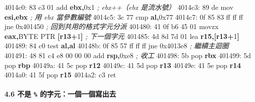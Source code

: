 \documentclass[10pt,a4paper]{article}
\newenvironment{Shaded}{\begin{snugshade}}{\end{snugshade}}
\newcommand{\BaseNTok}[1]{\textcolor[rgb]{0.00,0.00,0.81}{#1}}
\newcommand{\BuiltInTok}[1]{#1}
\newcommand{\CommentTok}[1]{\textcolor[rgb]{0.56,0.35,0.01}{\textit{#1}}}
\newcommand{\DataTypeTok}[1]{\textcolor[rgb]{0.13,0.29,0.53}{#1}}
\newcommand{\DecValTok}[1]{\textcolor[rgb]{0.00,0.00,0.81}{#1}}
\newcommand{\KeywordTok}[1]{\textcolor[rgb]{0.13,0.29,0.53}{\textbf{#1}}}
\newcommand{\NormalTok}[1]{#1}
\newcommand{\OperatorTok}[1]{\textcolor[rgb]{0.81,0.36,0.00}{\textbf{#1}}}
\renewenvironment{Shaded}{%
  \def\FrameCommand{\fboxsep=3.2pt\colorbox{shadecolor}}%
  \MakeFramed{\advance\hsize-\width\FrameRestore\small}%
}{%
  \endMakeFramed
}
\begin{document}
\begin{Shaded}
\begin{Highlighting}[]
\NormalTok{  4014c0: 83 c3 }\DecValTok{01}\NormalTok{           add  }\KeywordTok{ebx}\OperatorTok{,}\BaseNTok{0x1}          \CommentTok{; ebx++（ebx 是流水號）}
\NormalTok{  4014c3: 89 de              mov  }\KeywordTok{esi}\OperatorTok{,}\KeywordTok{ebx}          \CommentTok{; 用 ebx 當參數編號}
\NormalTok{  4014c5: 3c 77              }\BuiltInTok{cmp}  \KeywordTok{al}\OperatorTok{,}\BaseNTok{0x77}
\NormalTok{  4014c7: 0f 85 83 ff ff ff  jne  }\BaseNTok{0x401450}        \CommentTok{; 回到共用的格式字元分派}
\NormalTok{  401480: 41 0f b6 }\DecValTok{45} \DecValTok{01}\NormalTok{     movzx }\KeywordTok{eax}\OperatorTok{,}\DataTypeTok{BYTE} \DataTypeTok{PTR} \OperatorTok{[}\KeywordTok{r13}\OperatorTok{+}\DecValTok{1}\OperatorTok{]}  \CommentTok{; 下一個字元}
\NormalTok{  401485: 4d 8d 7d 01        }\BuiltInTok{lea}  \KeywordTok{r15}\OperatorTok{,[}\KeywordTok{r13}\OperatorTok{+}\DecValTok{1}\OperatorTok{]}
\NormalTok{  401489: 84 c0              test }\KeywordTok{al}\OperatorTok{,}\KeywordTok{al}
\NormalTok{  40148b: 0f 85 57 ff ff ff  jne  }\BaseNTok{0x4013e8}        \CommentTok{; 繼續主迴圈}
\NormalTok{  401491: 48 81 c4 e8 }\DecValTok{00} \DecValTok{00} \DecValTok{00}\NormalTok{  add }\KeywordTok{rsp}\OperatorTok{,}\BaseNTok{0xe8}    \CommentTok{; 收工}
\NormalTok{  401498: 5b                 }\BuiltInTok{pop}  \KeywordTok{rbx}
\NormalTok{  401499: 5d                 }\BuiltInTok{pop}  \KeywordTok{rbp}
\NormalTok{  40149a: 41 5c              }\BuiltInTok{pop}  \KeywordTok{r12}
\NormalTok{  40149c: 41 5d              }\BuiltInTok{pop}  \KeywordTok{r13}
\NormalTok{  40149e: 41 5e              }\BuiltInTok{pop}  \KeywordTok{r14}
\NormalTok{  4014a0: 41 5f              }\BuiltInTok{pop}  \KeywordTok{r15}
\NormalTok{  4014a2: c3                 ret}
\end{Highlighting}
\end{Shaded}

\paragraph{\texorpdfstring{4.6 不是 \texttt{\%\allowbreak{}}
的字元：一個一個寫出去}{4.6 不是 \% 的字元：一個一個寫出去}}\label{ux4e0dux662f-ux7684ux5b57ux5143ux4e00ux500bux4e00ux500bux5bebux51faux53bb}
\end{document}
